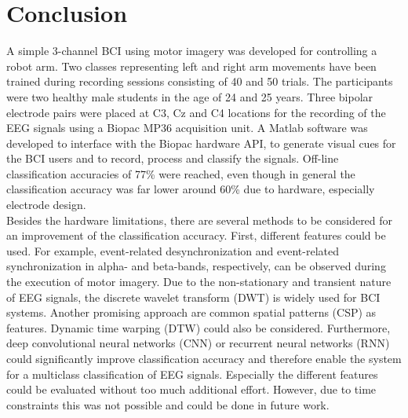 \documentclass[a4paper,oneside, openright,12pt]{report}
\begin{document}
\chapter{Conclusion}
A simple 3-channel BCI using motor imagery was developed for controlling a robot arm. Two classes representing left and right arm movements have been trained during recording sessions consisting of 40 and 50 trials. The participants were two healthy male students in the age of 24 and 25 years. Three bipolar electrode pairs were placed at C3, Cz and C4 locations for the recording of the EEG signals using a Biopac MP36 acquisition unit. A Matlab software was developed to interface with the Biopac hardware API, to generate visual cues for the BCI users and to record, process and classify the signals. Off-line classification accuracies of 77\% were reached, even though in general the classification accuracy was far lower around 60\% due to hardware, especially electrode design. \\
Besides the hardware limitations, there are several methods to be considered for an improvement of the classification accuracy. First, different features could be used. For example, event-related desynchronization and event-related synchronization in alpha- and beta-bands, respectively, can be observed during the execution of motor imagery. Due to the non-stationary and transient nature of EEG signals, the discrete wavelet transform (DWT) is widely used for BCI systems. Another promising approach are common spatial patterns (CSP) as features. Dynamic time warping (DTW) could also be considered. Furthermore, deep convolutional neural networks (CNN) or recurrent neural networks (RNN) could significantly improve classification accuracy and therefore enable the system for a multiclass classification of EEG signals. Especially the different features could be evaluated without too much additional effort. However, due to time constraints this was not possible and could be done in future work.




\cleardoublepage
{}
\listoffigures 	 %


\cleardoublepage
{}


\end{document}
